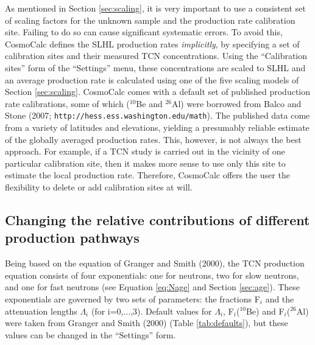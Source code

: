 \documentclass{article}
\begin{document}
As mentioned in Section \ref{sec:scaling}, it is very important to use
a consistent  set of  scaling factors for  the unknown sample  and the
production  rate  calibration  site.   Failing  to  do  so  can  cause
significant systematic  errors.  To avoid this,  CosmoCalc defines the
SLHL  production  rates  {\it  implicitly},  by specifying  a  set  of
calibration sites  and their  measured TCN concentrations.   Using the
``Calibration   sites''   form  of   the   ``Settings''  menu,   these
concentrations are  scaled to SLHL  and an average production  rate is
calculated  using   one  of  the   five  scaling  models   of  Section
\ref{sec:scaling}.  CosmoCalc  comes with  a default set  of published
production rate calibrations, some  of which ($^{10}$Be and $^{26}$Al)
were      borrowed      from      Balco     and      Stone      (2007;
\texttt{http://hess.ess.washington.edu/math}).    The  published  data
come from a variety of latitudes and elevations, yielding a presumably
reliable estimate  of the  globally averaged production  rates.  This,
however, is not always the best approach.  For example, if a TCN study
is carried  out in  the vicinity of  one particular  calibration site,
then it makes  more sense to use only this site  to estimate the local
production rate.  Therefore, CosmoCalc offers the user the flexibility
to delete or add calibration sites at will.

\subsection{Changing the relative contributions of different production pathways} \label{sec:F}

Being  based on  the equation  of Granger  and Smith  (2000),  the TCN
production equation  consists of four exponentials:  one for neutrons,
two  for  slow neutrons,  and  one  for  fast neutrons  (see  Equation
\ref{eq:Nage}  and  Section  \ref{sec:age}).  These  exponentials  are
governed  by two  sets  of  parameters: the  fractions  F$_i$ and  the
attenuation lengths  $\Lambda_i$ (for i=0,...,3).   Default values for
$\Lambda_i$,  F$_i$($^{10}$Be) and  F$_i$($^{26}$Al)  were taken  from
Granger and Smith (2000)  (Table \ref{tab:defaults}), but these values
can be changed in the ``Settings'' form.
\\
\end{document}
